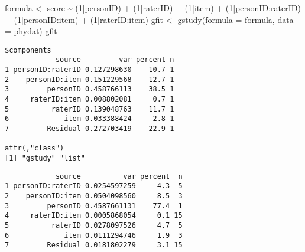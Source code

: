 \documentclass[
]{book}
\newenvironment{Shaded}{\begin{snugshade}}{\end{snugshade}}
\newcommand{\AttributeTok}[1]{\textcolor[rgb]{0.77,0.63,0.00}{#1}}
\newcommand{\DecValTok}[1]{\textcolor[rgb]{0.00,0.00,0.81}{#1}}
\newcommand{\FunctionTok}[1]{\textcolor[rgb]{0.00,0.00,0.00}{#1}}
\newcommand{\NormalTok}[1]{#1}
\newcommand{\OtherTok}[1]{\textcolor[rgb]{0.56,0.35,0.01}{#1}}
\newcommand{\SpecialCharTok}[1]{\textcolor[rgb]{0.00,0.00,0.00}{#1}}
\newcommand{\StringTok}[1]{\textcolor[rgb]{0.31,0.60,0.02}{#1}}
\begin{document}
\begin{Shaded}
\begin{Highlighting}[]
\NormalTok{formula }\OtherTok{\textless{}{-}}\NormalTok{ score }\SpecialCharTok{\textasciitilde{}}\NormalTok{ (}\DecValTok{1}\SpecialCharTok{|}\NormalTok{personID) }\SpecialCharTok{+}\NormalTok{ (}\DecValTok{1}\SpecialCharTok{|}\NormalTok{raterID) }\SpecialCharTok{+}\NormalTok{ (}\DecValTok{1}\SpecialCharTok{|}\NormalTok{item) }\SpecialCharTok{+} 
\NormalTok{  (}\DecValTok{1}\SpecialCharTok{|}\NormalTok{personID}\SpecialCharTok{:}\NormalTok{raterID) }\SpecialCharTok{+}\NormalTok{ (}\DecValTok{1}\SpecialCharTok{|}\NormalTok{personID}\SpecialCharTok{:}\NormalTok{item) }\SpecialCharTok{+}\NormalTok{ (}\DecValTok{1}\SpecialCharTok{|}\NormalTok{raterID}\SpecialCharTok{:}\NormalTok{item)}
\NormalTok{gfit }\OtherTok{\textless{}{-}} \FunctionTok{gstudy}\NormalTok{(}\AttributeTok{formula =}\NormalTok{ formula, }\AttributeTok{data =}\NormalTok{ phydat)}
\NormalTok{gfit}
\end{Highlighting}
\end{Shaded}

\begin{verbatim}
$components
            source         var percent n
1 personID:raterID 0.127298630    10.7 1
2    personID:item 0.151229568    12.7 1
3         personID 0.458766113    38.5 1
4     raterID:item 0.008802081     0.7 1
5          raterID 0.139048763    11.7 1
6             item 0.033388424     2.8 1
7         Residual 0.272703419    22.9 1

attr(,"class")
[1] "gstudy" "list"  
\end{verbatim}

\begin{Shaded}
\end{Shaded}

\begin{verbatim}
            source          var percent  n
1 personID:raterID 0.0254597259     4.3  5
2    personID:item 0.0504098560     8.5  3
3         personID 0.4587661131    77.4  1
4     raterID:item 0.0005868054     0.1 15
5          raterID 0.0278097526     4.7  5
6             item 0.0111294746     1.9  3
7         Residual 0.0181802279     3.1 15
\end{verbatim}
\end{document}
